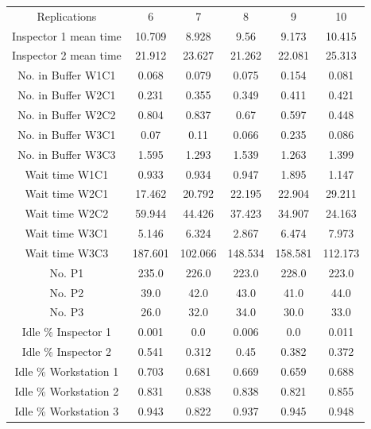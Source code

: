\documentclass{article}
\begin{document}
\begin{table}[htp]
\begin{center}
\begin{tabular}{cccccc}
\hline
Replications & 6 & 7 & 8 & 9 & 10\\
Inspector 1 mean time&10.709&8.928&9.56&9.173&10.415\\
Inspector 2 mean time&21.912&23.627&21.262&22.081&25.313\\
No. in Buffer W1C1&0.068&0.079&0.075&0.154&0.081\\
No. in Buffer W2C1&0.231&0.355&0.349&0.411&0.421\\
No. in Buffer W2C2&0.804&0.837&0.67&0.597&0.448\\
No. in Buffer W3C1&0.07&0.11&0.066&0.235&0.086\\
No. in Buffer W3C3&1.595&1.293&1.539&1.263&1.399\\
Wait time W1C1&0.933&0.934&0.947&1.895&1.147\\
Wait time W2C1&17.462&20.792&22.195&22.904&29.211\\
Wait time W2C2&59.944&44.426&37.423&34.907&24.163\\
Wait time W3C1&5.146&6.324&2.867&6.474&7.973\\
Wait time W3C3&187.601&102.066&148.534&158.581&112.173\\
No. P1&235.0&226.0&223.0&228.0&223.0\\
No. P2&39.0&42.0&43.0&41.0&44.0\\
No. P3&26.0&32.0&34.0&30.0&33.0\\
Idle \% Inspector 1&0.001&0.0&0.006&0.0&0.011\\
Idle \% Inspector 2&0.541&0.312&0.45&0.382&0.372\\
Idle \% Workstation 1&0.703&0.681&0.669&0.659&0.688\\
Idle \% Workstation 2&0.831&0.838&0.838&0.821&0.855\\
Idle \% Workstation 3&0.943&0.822&0.937&0.945&0.948\\
\hline

\end{tabular}
\end{center}
\label{default}
\end{table}%
\end{document}
